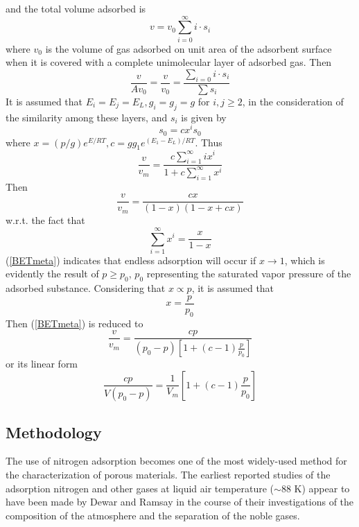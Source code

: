 \documentclass[%
 reprint,
 amsmath,amssymb,
 aps,
10.5pt,
]{revtex4-1}
\begin{document}
and the total volume adsorbed is 
\begin{equation}
v = v_0 \sum_{i=0}^{\infty} i \cdot s_i
\end{equation}
where $v_0$ is the volume of gas adsorbed on unit area of the adsorbent surface when it is covered with a complete unimolecular layer of adsorbed gas. Then
\begin{equation}
\frac{v}{Av_0} = \frac{v}{v_0} = \frac{\sum_{i=0} i\cdot s_i}{\sum s_i}
\end{equation}
It is assumed that $E_i = E_j =E_L, g_i = g_j = g$ for $i,j \geq 2$, in the consideration of the similarity among these layers, and $s_i$ is given by
\begin{equation}
s_0 = c x^i s_0
\end{equation}
where $x = (p/g) e^{E/RT}, c = g g_1 e^{(E_1-E_L)/RT}$. Thus
\begin{equation}
\frac{v}{v_m} = \frac{c \sum_{i=1}^\infty i x^i}{1+ c \sum_{i=1}^\infty x^i}
\end{equation}
Then
\begin{equation}
\frac{v}{v_m} = \frac{cx}{(1-x)(1-x+cx)}
\label{BETmeta}
\end{equation}
w.r.t. the fact that
\begin{equation}
\sum_{i=1}^{\infty} x^i = \frac{x}{1-x} 
\end{equation}
(\ref{BETmeta}) indicates that endless adsorption will occur if $x \rightarrow 1$, which is evidently the result of $p \geqslant p_0$, $p_0$ representing the saturated vapor pressure of the adsorbed substance. Considering that $x \propto p$, it is assumed that
\begin{equation}
x= \frac{p}{p_0}
\end{equation}
Then (\ref{BETmeta}) is reduced to
\begin{equation}
\frac{v}{v_m} = \frac{c p}{(p_0-p)\left[1+(c-1)\frac{p}{p_0}\right]}
\end{equation}
or its linear form
\begin{equation}
\frac{c p}{V(p_0-p)} = \frac{1}{V_m}\left[1+(c-1)\frac{p}{p_0}\right]
\label{BETeq}
\end{equation}

\subsection{Methodology}
The use of nitrogen adsorption becomes one of the most widely-used method for the characterization of porous materials. The earliest reported studies of the adsorption nitrogen and other gases at liquid air temperature ($\sim$88 K) appear to have been made by Dewar and Ramsay in the course of their investigations of the composition of the atmosphere and the separation of the noble gases.\cite{SING20013}
\end{document}
